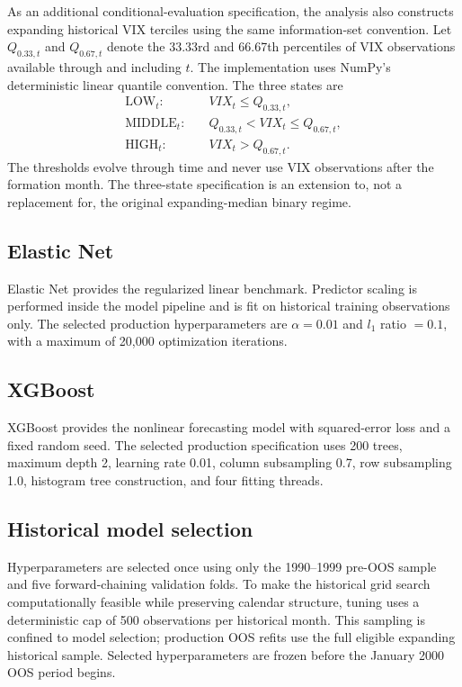 As an additional conditional-evaluation specification, the analysis also constructs expanding historical VIX terciles using the same information-set convention. Let $Q_{0.33,t}$ and $Q_{0.67,t}$ denote the 33.33rd and 66.67th percentiles of VIX observations available through and including $t$. The implementation uses NumPy's deterministic linear quantile convention. The three states are
\begin{equation}
\begin{aligned}
\mathrm{LOW}_t: \quad &VIX_t\leq Q_{0.33,t}, \\
\mathrm{MIDDLE}_t: \quad &Q_{0.33,t}<VIX_t\leq Q_{0.67,t}, \\
\mathrm{HIGH}_t: \quad &VIX_t>Q_{0.67,t}.
\end{aligned}
\end{equation}
The thresholds evolve through time and never use VIX observations after the formation month. The three-state specification is an extension to, not a replacement for, the original expanding-median binary regime.

\subsection{Elastic Net}

Elastic Net provides the regularized linear benchmark. Predictor scaling is performed inside the model pipeline and is fit on historical training observations only. The selected production hyperparameters are $\alpha=0.01$ and $l_1$ ratio $=0.1$, with a maximum of 20,000 optimization iterations.

\subsection{XGBoost}

XGBoost provides the nonlinear forecasting model with squared-error loss and a fixed random seed. The selected production specification uses 200 trees, maximum depth 2, learning rate 0.01, column subsampling 0.7, row subsampling 1.0, histogram tree construction, and four fitting threads.

\subsection{Historical model selection}

Hyperparameters are selected once using only the 1990--1999 pre-OOS sample and five forward-chaining validation folds. To make the historical grid search computationally feasible while preserving calendar structure, tuning uses a deterministic cap of 500 observations per historical month. This sampling is confined to model selection; production OOS refits use the full eligible expanding historical sample. Selected hyperparameters are frozen before the January 2000 OOS period begins.

